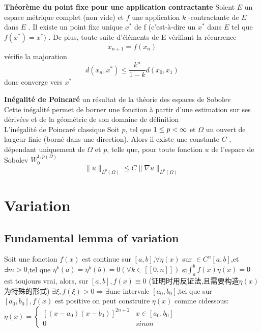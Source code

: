 \documentclass{book}
\begin{document}
\textbf{Th\'eor\`eme du point fixe pour une application contractante}\newline
Soient $ E$  un espace m\'etrique complet (non vide) et $ f$  une application $ k$ -contractante de $ E$  dans $ E$ . Il existe un point fixe unique $x^*$ de f (c'est-\`a-dire un $x^*$ dans $ E$  tel que $ f(x^* ) = x^*)$ . De plus, toute suite d'\'el\'ements de E v\'erifiant la r\'ecurrence
$$x_{n+1}=f(x_n)$$
v\'erifie la majoration
$$d(x_n,x^*) \le \frac {k^n}{1-k} d(x_0,x_1)$$
donc converge vers $x^*$
\bigskip

\textbf{In\'egalit\'e de Poincar\'e}
un r\'esultat de la th\'eorie des espaces de Sobolev\\
Cette in\'egalit\'e permet de borner une fonction \`a partir d'une estimation sur ses d\'eriv\'ees et de la g\'eom\'etrie de son domaine de d\'efinition\\
L'in\'egalit\'e de Poincar\'e classique
Soit $p$, tel que $ 1 \leq p < \infty$  et $\Omega$ un ouvert de largeur finie (born\'e dans une direction). Alors il existe une constante  $  C$  , d\'ependant uniquement de $\Omega$ et $p$, telle que, pour toute fonction $u$   de l'espace de Sobolev $W_0^{1,p(\Omega)}$
$$
\| u \|_{L^{p} (\Omega)} \leq C \| \nabla u \|_{L^{p} (\Omega)}
$$

\chapter{Variation}
\section{Fundamental lemma of variation}
\begin{theorem}
    Soit une fonction $f(x)$ est continue sur $[a,b]$,$ \forall \eta(x)$ sur $\in C^{n}[a,b]$,et $\exists m>0$,tel que $\eta^{k}(a)=\eta^{k}(b)=0 (\forall k \in [[0,n]])$ \newline
    si$ \int_{a}^{b}f(x)\eta(x)=0$ est toujours vrai, \newline
    alors, sur $[a,b],f(x)\equiv 0$ \newline
    (证明时用反证法,且需要构造$\eta(x)$为特殊的形式)
    $\exists \xi,f(\xi)>0 \Rightarrow \exists $une intervale $[a_0,b_0]$,tel que sur $[a_0,b_0],f(x)$ est positive \newline
 on peut construire $\eta(x)$ comme cidessous:
$\eta(x)=
    \left\{
      \begin{array}{ll}
        [(x-a_0)(x-b_0)]^{2n+2} & x \in [a_0,b_0] \\
        0 & sinon
      \end{array}
    \right.
    $
\end{theorem}
\end{document}
